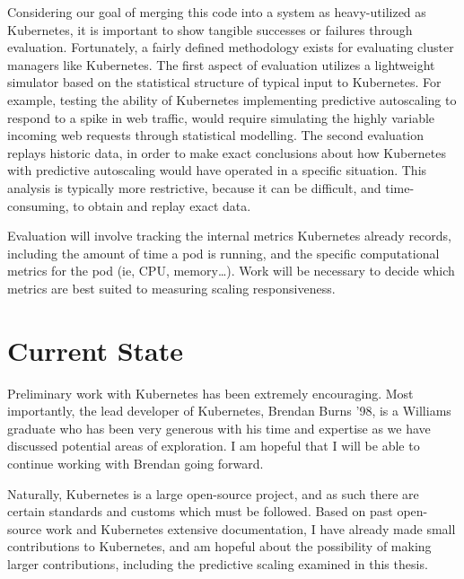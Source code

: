 \documentclass[letterpaper,11pt,twocolumn]{article}
\begin{document}
Considering our goal of merging this code into a system as heavy-utilized as
Kubernetes, it is important to show tangible successes or failures through
evaluation. Fortunately, a fairly defined methodology exists
for evaluating cluster managers like
Kubernetes.\cite[pg. 355]{omega} The first aspect of evaluation utilizes a
lightweight simulator based on the statistical structure of typical input to
Kubernetes. For example, testing the ability of Kubernetes implementing
predictive autoscaling to respond to a spike in web traffic,
would require simulating the highly variable incoming web requests through statistical
modelling. The second evaluation replays historic data, in order to make exact
conclusions about how Kubernetes with predictive autoscaling would have operated in a
specific situation. This analysis is typically more restrictive, because it can
be difficult, and time-consuming, to obtain and replay exact data.

Evaluation will involve tracking the internal metrics Kubernetes already
records, including the amount of time a pod is running, and the specific
computational metrics for the pod (ie, CPU, memory\dots). Work will be
necessary to decide which metrics are best suited to measuring scaling responsiveness.

\section{Current State}

Preliminary work with Kubernetes has been extremely encouraging. Most importantly,
the lead developer of Kubernetes, Brendan Burns '98, is a Williams graduate who has
been very generous with his time and expertise as we have discussed potential
areas of exploration. I am hopeful that I will be able to continue
working with Brendan going forward.

Naturally, Kubernetes is a large open-source project, and as such there are
certain standards and customs which must be followed. Based on past open-source
work and Kubernetes extensive documentation, I have already made small
contributions to Kubernetes, and am hopeful about the possibility of making
larger contributions, including the predictive scaling examined in this thesis.



\end{document}
